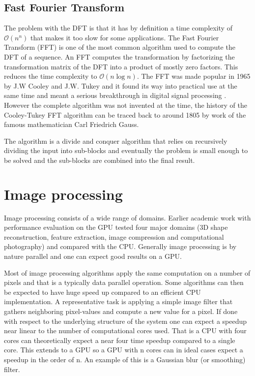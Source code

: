 \subsection{Fast Fourier Transform}\label{sec:algorithms:fft}
The problem with the DFT is that it has by definition a time complexity of $\mathcal{O}(n^n)$ that makes it too slow for some applications. The Fast Fourier Transform (FFT) is one of the most common algorithm used to compute the DFT of a sequence. An FFT computes the transformation by factorizing the transformation matrix of the DFT into a product of mostly zero factors. This reduces the time complexity to $\mathcal{O}(n\log{}n)$.
The FFT was made popular in 1965 by J.W Cooley and J.W. Tukey and it found its way into practical use at the same time and meant a serious breakthrough in digital signal processing \cite{Cooley1969, Brigham1967}. However the complete algorithm was not invented at the time, the history of the Cooley-Tukey FFT algorithm can be traced back to around 1805 by work of the famous mathematician Carl Friedrich Gauss\cite{Heideman1985}.

The algorithm is a divide and conquer algorithm that relies on recursively dividing the input into sub-blocks and eventually the problem is small enough to be solved and the sub-blocks are combined into the final result.
\section{Image processing}
Image processing consists of a wide range of domains. Earlier academic work with performance evaluation on the GPU\cite{Park2011} tested four major domains (3D shape reconstruction, feature extraction, image compression and computational photography) and compared with the CPU. Generally image processing is by nature parallel and one can expect good results on a GPU.

Most of image processing algorithms apply the same computation on a number of pixels and that is a typically data parallel operation. Some algorithms can then be expected to have huge speed up compared to an efficient CPU implementation. A representative task is applying a simple image filter that gathers neighboring pixel-values and compute a new value for a pixel. If done with respect to the underlying structure of the system one can expect a speedup near linear to the number of computational cores used. That is a CPU with four cores can theoretically expect a near four time speedup compared to a single core. This extends to a GPU so a GPU with n cores can in ideal cases expect a speedup in the order of n. An example of this is a Gaussian blur (or smoothing) filter.

